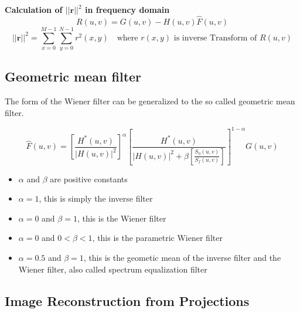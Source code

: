 \textbf{Calculation of $||\mathbf{r}||^2$ in frequency domain}
	\begin{equation}
		R(u,v) = G(u,v) - H(u,v)\hat{F}(u,v)
	\end{equation}
	\begin{equation}
		||\mathbf{r}||^2 = \sum\limits_{x=0}^{M-1} \sum\limits_{y=0}^{N-1} r^{2}(x,y) \quad \textrm{where } r(x,y) \textrm{ is inverse Transform of } R(u,v) 
		\label{eq:rCalculateFreq}
	\end{equation}

\subsection{Geometric mean filter }
The form of the Wiener filter can be generalized to the so called geometric mean filter.

\begin{equation}
	\hat{F}(u,v) =  \left[ \frac{H^*(u,v)}{|H(u,v)|^2} \right]^{\alpha}  \left[ \frac{H^*(u,v)}{|H(u,v)|^2 + \beta \left[ \frac{S_\eta(u,v)}{S_f(u,v)}\right]} \right]^{1-\alpha} G(u,v)
\end{equation}

\begin{itemize}
	\item $\alpha$ and $\beta$ are positive constants
	\item $\alpha = 1$, this is simply the inverse filter
	\item $\alpha=0$ and $\beta=1$, this is the Wiener filter
	\item $\alpha=0$ and $0 < \beta < 1$, this is the parametric Wiener filter
	\item $\alpha=0.5$ and $\beta=1$, this is the geometic mean of the inverse filter and the Wiener filter, also called spectrum equalization filter
\end{itemize}

\subsection{Image Reconstruction from Projections }